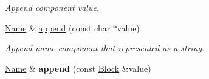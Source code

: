 \begin{DoxyCompactItemize}
\begin{DoxyCompactList}\small\item\em Append component {\ttfamily value}. \end{DoxyCompactList}\item 
\hyperlink{classndn_1_1Name}{Name} \& \hyperlink{classndn_1_1Name_adc108c91cf5adde188bc9a71e7709c52}{append} (const char $\ast$value)
\begin{DoxyCompactList}\small\item\em Append name component that represented as a string. \end{DoxyCompactList}\item 
\hyperlink{classndn_1_1Name}{Name} \& {\bfseries append} (const \hyperlink{classndn_1_1Block}{Block} \&value)\hypertarget{classndn_1_1Name_a9af61e1dd2c46a326ad7814cb1d0336f}{}\label{classndn_1_1Name_a9af61e1dd2c46a326ad7814cb1d0336f}


\end{DoxyCompactItemize}
